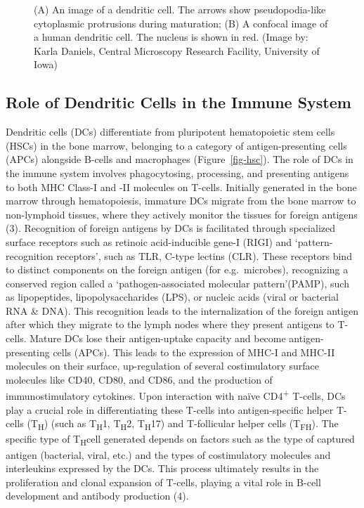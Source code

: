 \documentclass[
]{article}
\begin{document}
\begin{figure}


\caption{\label{fig-dc}(A) An image of a dendritic cell. The arrows show
pseudopodia-like cytoplasmic protrusions during maturation; (B) A
confocal image of a human dendritic cell. The nucleus is shown in red.
(Image by: Karla Daniels, Central Microscopy Research Facility,
University of Iowa)}

\end{figure}%

\subsection{Role of Dendritic Cells in the Immune
System}\label{role-of-dendritic-cells-in-the-immune-system}

Dendritic cells (DCs) differentiate from pluripotent hematopoietic stem
cells (HSCs) in the bone marrow, belonging to a category of
antigen-presenting cells (APCs) alongside B-cells and macrophages
(Figure~\ref{fig-hsc}). The role of DCs in the immune system involves
phagocytosing, processing, and presenting antigens to both MHC Class-I
and -II molecules on T-cells. Initially generated in the bone marrow
through hematopoiesis, immature DCs migrate from the bone marrow to
non-lymphoid tissues, where they actively monitor the tissues for
foreign antigens (3). Recognition of foreign antigens by DCs is
facilitated through specialized surface receptors such as retinoic
acid-inducible gene-I (RIGI) and `pattern-recognition receptors', such
as TLR, C-type lectins (CLR). These receptors bind to distinct
components on the foreign antigen (for e.g.~microbes), recognizing a
conserved region called a `pathogen-associated molecular pattern'(PAMP),
such as lipopeptides, lipopolysaccharides (LPS), or nucleic acids (viral
or bacterial RNA \& DNA). This recognition leads to the internalization
of the foreign antigen after which they migrate to the lymph nodes where
they present antigens to T-cells. Mature DCs lose their antigen-uptake
capacity and become antigen-presenting cells (APCs). This leads to the
expression of MHC-I and MHC-II molecules on their surface, up-regulation
of several costimulatory surface molecules like CD40, CD80, and CD86,
and the production of immunostimulatory cytokines. Upon interaction with
naïve CD4\textsuperscript{+} T-cells, DCs play a crucial role in
differentiating these T-cells into antigen-specific helper T-cells
(T\textsubscript{H}) (such as T\textsubscript{H}1, T\textsubscript{H}2,
T\textsubscript{H}17) and T-follicular helper cells
(T\textsubscript{FH}). The specific type of T\textsubscript{H}cell
generated depends on factors such as the type of captured antigen
(bacterial, viral, etc.) and the types of costimulatory molecules and
interleukins expressed by the DCs. This process ultimately results in
the proliferation and clonal expansion of T-cells, playing a vital role
in B-cell development and antibody production (4).
\end{document}
